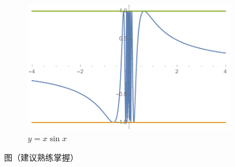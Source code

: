 \begin{figure}[h]
	\begin{subfigure}[t]{0.45\textwidth}
		\centering
		\includegraphics[width=\textwidth]{./images/Ch01/sin1x.pdf}
		\caption{$y=x\sin x$}
	\end{subfigure}
	\caption{\exNo 图（建议熟练掌握）}
	\label{fig:sinFigures}
\end{figure}

